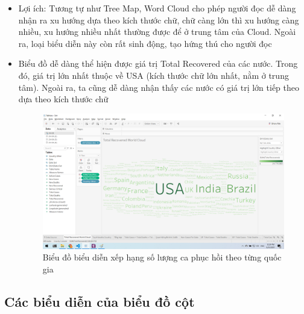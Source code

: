 \documentclass[a4paper, 12pt]{article}
\begin{document}
\begin{itemize}
    \item Lợi ích: Tương tự như Tree Map, Word Cloud cho phép người đọc dễ dàng nhận ra xu hướng dựa theo kích thước chữ, chữ càng lớn thì xu hướng càng nhiều, xu hướng nhiều nhất thường được để ở trung tâm của Cloud. Ngoài ra, loại biểu diễn này còn rất sinh động, tạo hứng thú cho người đọc
    \item Biểu đồ dễ dàng thể hiện được giá trị Total Recovered của các nước. Trong đó, giá trị lớn nhất thuộc về USA (kích thước chữ lớn nhất, nằm ở trung tâm). Ngoài ra, ta cũng dễ dàng nhận thấy các nước có giá trị lớn tiếp theo dựa theo kích thước chữ
    \begin{figure}[H]
        \begin{center}
            \includegraphics[scale=0.4]{img/cloud.png}
            \caption{Biểu đồ biểu diễn xếp hạng số lượng ca phục hồi theo từng quốc gia}
        \end{center}
    \end{figure}
\end{itemize}

\subsection{Các biểu diễn của biểu đồ cột}
\end{document}
